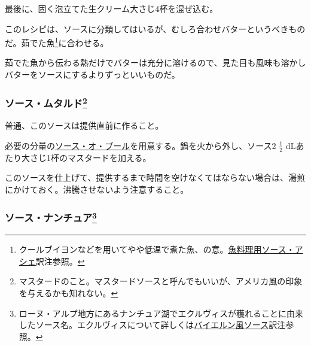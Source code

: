 \begin{recette}
最後に、固く泡立てた生クリーム大さじ4杯を混ぜ込む。

このレシピは、ソースに分類してはいるが、むしろ合わせバターというべきものだ。茹でた魚\footnote{クールブイヨンなどを用いてやや低温で煮た魚、の意。\protect\hyperlink{sauce-hachee-maigre}{魚料理用ソース・アシェ}訳注参照。}に合わせる。

茹でた魚から伝わる熱だけでバターは充分に溶けるので、見た目も風味も溶かしバターをソースにするよりずっといいものだ。

\hypertarget{sauce-moutarde}{%
\subsubsection[ソース・ムタルド]{\texorpdfstring{ソース・ムタルド\footnote{マスタードのこと。マスタードソースと呼んでもいいが、アメリカ風の印象を与えるかも知れない。}}{ソース・ムタルド}}\label{sauce-moutarde}}



普通、このソースは提供直前に作ること。

必要の分量の\protect\hyperlink{sauce-au-beurre}{ソース・オ・ブール}を用意する。鍋を火から外し、ソース2
\(\frac{1}{2}\) dLあたり大さじ1杯のマスタードを加える。

このソースを仕上げて、提供するまで時間を空けなくてはならない場合は、湯煎にかけておく。沸騰させないよう注意すること。

\hypertarget{sauce-nantua}{%
\subsubsection[ソース・ナンチュア]{\texorpdfstring{ソース・ナンチュア\footnote{ローヌ・アルプ地方にあるナンチュア湖でエクルヴィスが穫れることに由来したソース名。エクルヴィスについて詳しくは\protect\hyperlink{sauce-bavaroise}{バイエルン風ソース}訳注参照。}}{ソース・ナンチュア}}\label{sauce-nantua}}




\end{recette}

